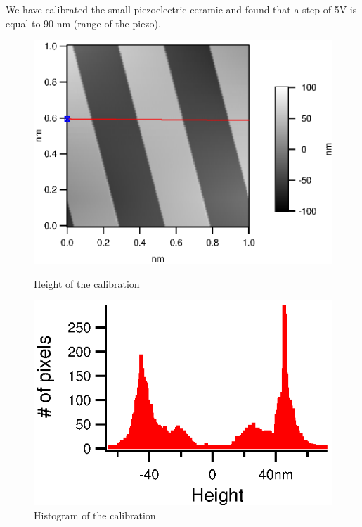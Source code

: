 We have calibrated the small piezoelectric ceramic and found that a step of 5V is equal to 90 nm (range of the piezo).
\begin{figure}[!ht]
\begin{minipage}[b]{0.45\linewidth}
\centering
\includegraphics[width=\textwidth]{images/Calib1vPP_HeightMap.eps}
\caption{Height of the calibration}
\label{fig:figure1}
\end{minipage}
\hspace{0.5cm}
\begin{minipage}[b]{0.45\linewidth}
\centering
\includegraphics[width=\textwidth]{images/Calib1VppHisto.eps}
\caption{Histogram of the calibration}
\label{fig:figure2}
\end{minipage}
\end{figure}

